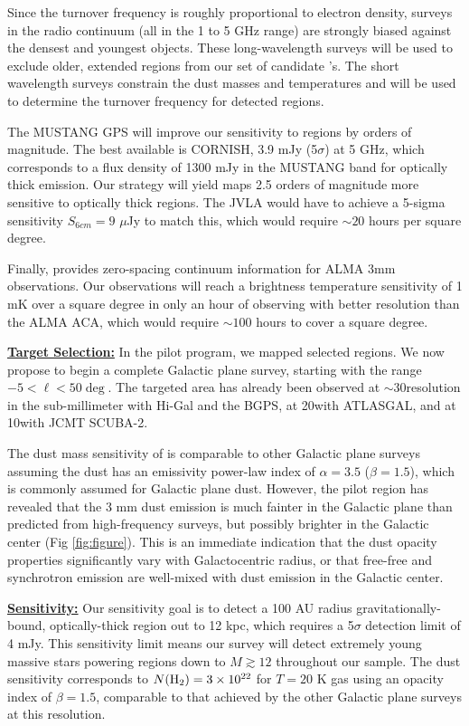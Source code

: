 \documentclass[11pt,preprint]{aastex_nofoot}
\begin{document}
Since the turnover frequency is roughly proportional to electron density,
surveys in the radio continuum (all in the 1 to 5 GHz range) are strongly
biased against the densest and youngest objects.  These long-wavelength surveys
will be used to exclude older, extended \uchii regions from our set of
candidate \hchii's.  The short wavelength surveys constrain the dust masses and
temperatures and will be used to determine the turnover frequency for detected
\hchii regions.

The MUSTANG GPS will improve our sensitivity to \hchii regions by orders of
magnitude. The best available is CORNISH, 3.9 mJy (5$\sigma$) at 5 GHz, which
corresponds to a flux density of 1300 mJy in the MUSTANG band for optically
thick emission. Our strategy will yield maps 2.5 orders of magnitude more
sensitive to optically thick \hchii regions.  The JVLA would have to achieve a
5-sigma sensitivity $S_{6cm} = 9$ $\mu$Jy to match this, which would require
$\sim20$ hours per square degree.




Finally, \MGPS provides zero-spacing continuum information for
ALMA 3mm observations.  Our observations will reach a brightness temperature
sensitivity of 1 mK over a square degree in only an hour of observing with
better resolution than the ALMA ACA, which would require $\sim100$ hours to
cover a square degree.

\indent\underline{\textbf{\helv Target Selection:}}
In the pilot program, we mapped selected regions.  We now propose to begin a complete
Galactic plane survey, starting with the range $-5 < \ell < 50\deg$.
The targeted area has already been observed at $\sim$30\arcsec resolution in
the sub-millimeter with Hi-Gal and the BGPS, at 20\arcsec with ATLASGAL, and at
10\arcsec with JCMT SCUBA-2.  

The dust mass sensitivity of \MGPS is comparable to other Galactic plane surveys assuming the
dust has an emissivity power-law index of $\alpha=3.5$ ($\beta=1.5$), which is 
commonly assumed for Galactic plane
dust.   However, the pilot region has revealed that the 3 mm dust emission is much fainter
in the Galactic plane than predicted from high-frequency surveys,
but possibly brighter in the Galactic center (Fig \ref{fig:figure}).  This is an immediate
indication that the dust opacity properties significantly vary with Galactocentric
radius, or that free-free and synchrotron emission are well-mixed with dust emission
in the Galactic center.

\indent\underline{\textbf{\helv Sensitivity:}}  Our sensitivity goal is to
detect a 100 AU radius gravitationally-bound, optically-thick \hii region out to 12 kpc, which requires a
5$\sigma$ detection limit of 4 mJy.  This sensitivity limit means our survey
will detect extremely young massive stars powering \hii regions down
to $M \gtrsim 12$ \msun throughout our sample.  The dust sensitivity corresponds to
$N(\textrm{H}_{2})=3\times10^{22}$ \persc for $T=20$ K gas using an opacity index of
$\beta=1.5$, comparable to that achieved by the other Galactic plane surveys at
this resolution.
\end{document}
